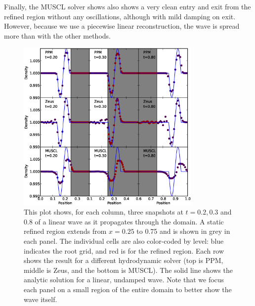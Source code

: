 Finally, the MUSCL solver shows also shows a very clean entry and exit from the refined region without any oscillations, although with mild damping on exit. However, because we use a piecewise linear reconstruction, the wave is spread more than with the other methods.

\begin{figure}
\begin{center}
\includegraphics[width=0.8\textwidth]{figures/WavePool.eps}
\caption{This plot shows, for each column, three snapshots at $t=0.2, 0.3$ and 0.8 of a linear wave as it propagates through the domain.  A static refined region extends from $x = 0.25$ to 0.75 and is shown in grey in each panel.  The individual cells are also color-coded by level: blue indicates the root grid, and red is for the refined region.  Each row shows the result for a different hydrodynamic solver (top is PPM, middle is Zeus, and the bottom is MUSCL).   The solid line shows the analytic solution for a linear, undamped wave.  Note that we focus each panel on a small region of the entire domain to better show the wave itself.}
\label{fig.wavepool}
\end{center}
\end{figure}
